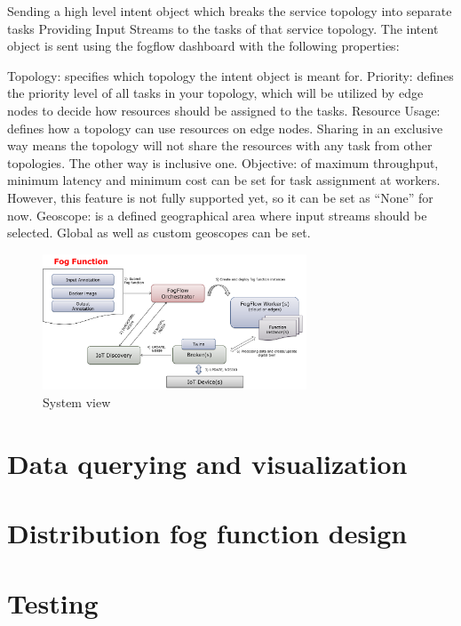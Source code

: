 \documentclass[conference]{ieeeconf}
\begin{document}
    Sending a high level intent object which breaks the service topology into separate tasks
    Providing Input Streams to the tasks of that service topology.
    The intent object is sent using the fogflow dashboard with the following properties:

    Topology: specifies which topology the intent object is meant for.
    Priority: defines the priority level of all tasks in your topology, which will be utilized by edge nodes to decide how resources should be assigned to the tasks.
    Resource Usage: defines how a topology can use resources on edge nodes. Sharing in an exclusive way means the topology will not share the resources with any task from other topologies. The other way is inclusive one.
    Objective: of maximum throughput, minimum latency and minimum cost can be set for task assignment at workers. However, this feature is not fully supported yet, so it can be set as “None” for now.
    Geoscope: is a defined geographical area where input streams should be selected. Global as well as custom geoscopes can be set.

    \begin{figure}[h]
        \centering
        \includegraphics[width=0.7\textwidth]{Images/function-orchestration.png}
        \caption{System view}
    \end{figure}{}


    \section{Data querying and visualization}


    \section{Distribution fog function design}


    \section{Testing}

    \printbibliography
\end{document}
